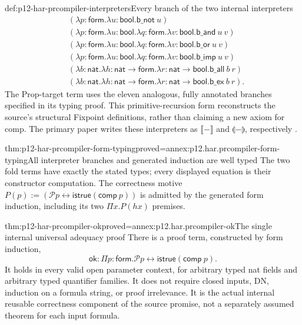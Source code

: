 \begin{hbdefinition}{def:p12-har-prcompiler-interpreters}{Every branch of the two internal interpreters}
\[\begin{aligned}
 & (\lambda p:\mathsf{form}.\lambda u:\mathsf{bool}.\mathsf{b\_not}\ u)\\
 & (\lambda p:\mathsf{form}.\lambda u:\mathsf{bool}.
     \lambda q:\mathsf{form}.\lambda v:\mathsf{bool}.\mathsf{b\_and}\ u\ v)\\
 & (\lambda p:\mathsf{form}.\lambda u:\mathsf{bool}.
     \lambda q:\mathsf{form}.\lambda v:\mathsf{bool}.\mathsf{b\_or}\ u\ v)\\
 & (\lambda p:\mathsf{form}.\lambda u:\mathsf{bool}.
     \lambda q:\mathsf{form}.\lambda v:\mathsf{bool}.\mathsf{b\_imp}\ u\ v)\\
 & (\lambda b:\mathsf{nat}.\lambda h:\mathsf{nat}\to\mathsf{form}.
     \lambda r:\mathsf{nat}\to\mathsf{bool}.\mathsf{b\_all}\ b\ r)\\
 & (\lambda b:\mathsf{nat}.\lambda h:\mathsf{nat}\to\mathsf{form}.
     \lambda r:\mathsf{nat}\to\mathsf{bool}.\mathsf{b\_ex}\ b\ r).
\end{aligned}
\]
The Prop-target term uses the eleven analogous, fully annotated
branches specified in its typing proof. This primitive-recursion form
reconstructs the source's structural Fixpoint definitions, rather than
claiming a new axiom for comp. The primary paper writes these interpreters
as \(\llbracket-\rrbracket\) and
\(\llparenthesis-\rrparenthesis\), respectively
\cite[Definitions~10--11, pp.~20--21]{OostdijkGeuvers2000ProofByComputationPreprint}.
\end{hbdefinition}

\begin{hblemma}{thm:p12-har-prcompiler-form-typing}{proved=annex:p12.har.prcompiler-form-typing}{All interpreter branches and generated induction are well typed}
The two fold terms have exactly the stated types; every displayed
equation is their constructor computation. The correctness motive
\(P(p):=(\mathcal P p\leftrightarrow\mathsf{istrue}(\mathsf{comp}\ p))\)
is admitted by the generated form induction, including its two
\(\Pi x.P(h x)\) premises.
\end{hblemma}

\begin{hbtheorem}{thm:p12-har-prcompiler-ok}{proved=annex:p12.har.prcompiler-ok}{The single internal universal adequacy proof}
There is a proof term, constructed by form induction,
\[
 \mathsf{ok}:\Pi p:\mathsf{form}.
            \mathcal P p\leftrightarrow\mathsf{istrue}(\mathsf{comp}\ p).
\]
It holds in every valid open parameter context, for arbitrary typed nat
fields and arbitrary typed quantifier families. It does not require
closed inputs, DN, induction on a formula string, or proof irrelevance.
It is the actual internal reusable correctness component of the source
promise, not a separately assumed theorem for each input formula.
\end{hbtheorem}

